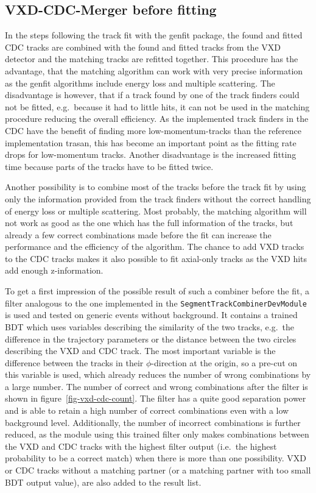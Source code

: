 \subsection{VXD-CDC-Merger before fitting}
In the steps following the track fit with the genfit package, the found and fitted CDC tracks are combined with the found and fitted tracks from the VXD detector and the matching tracks are refitted together. This procedure has the advantage, that the matching algorithm can work with very precise information as the genfit algorithms include energy loss and multiple scattering. The disadvantage is however, that if a track found by one of the track finders could not be fitted, e.g.\ because it had to little hits, it can not be used in the matching procedure reducing the overall efficiency. As the implemented track finders in the CDC have the benefit of finding more low-momentum-tracks than the reference implementation trasan, this has become an important point as the fitting rate drops for low-momentum tracks. Another disadvantage is the increased fitting time because parts of the tracks have to be fitted twice.

Another possibility is to combine most of the tracks before the track fit by using only the information provided from the track finders without the correct handling of energy loss or multiple scattering. Most probably, the matching algorithm will not work as good as the one which has the full information of the tracks, but already a few correct combinations made before the fit can increase the performance and the efficiency of the algorithm. The chance to add VXD tracks to the CDC tracks makes it also possible to fit axial-only tracks as the VXD hits add enough z-information. 

To get a first impression of the possible result of such a combiner before the fit, a filter analogous to the one implemented in the \texttt{SegmentTrackCombinerDevModule} is used and tested on generic events without background. It contains a trained BDT which uses variables describing the similarity of the two tracks, e.g.\ the difference in the trajectory parameters or the distance between the two circles describing the VXD and CDC track. The most important variable is the difference between the tracks in their $\phi$-direction at the origin, so a pre-cut on this variable is used, which already reduces the number of wrong combinations by a large number. The number of correct and wrong combinations after the filter is shown in figure~\ref{fig-vxd-cdc-count}. The filter has a quite good separation power and is able to retain a high number of correct combinations even with a low background level. Additionally, the number of incorrect combinations is further reduced, as the module using this trained filter only makes combinations between the VXD and CDC tracks with the highest filter output (i.e.\ the highest probability to be a correct match) when there is more than one possibility. VXD or CDC tracks without a matching partner (or a matching partner with too small BDT output value), are also added to the result list. 

